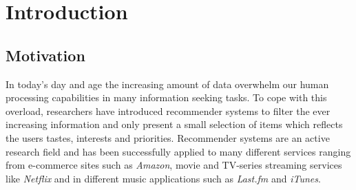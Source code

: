 
\chapter{Introduction}
\label{chap:introduction}
\minitoc
\setcounter{page}{1}
\clearpage

\newcommand{\ecommercenorway}[0]{
  \begin{figure}[H]
    \centering
    \begin{tikzpicture}
      \begin{axis}[
        xlabel={Year},
        ylabel={Percentage},
        legend style={cells={anchor=east}, legend pos=outer north east,},
        xtick=data,
        x tick label style={rotate=45, anchor=east, /pgf/number format/1000 sep=},
        mark size=1.0pt,
        grid=major,
        grid style={dashed},
      ]
      \legend{Both sexes, Men, Women}
      \addplot coordinates {
        (2005, 0)
        (2006, 20)
        (2007, 20)
        (2008, 22)
        (2009, 25)
        (2010, 32)
        (2011, 31)
        (2012, 33)
        (2013, 36)
      };
      \addplot coordinates {
        (2005, 0)
        (2006, 16)
        (2007, 18)
        (2008, 20)
        (2009, 23)
        (2010, 30)
        (2011, 30)
        (2012, 29)
        (2013, 30)
      };
      \addplot coordinates {
        (2005, 0)
        (2006, 24)
        (2007, 23)
        (2008, 23)
        (2009, 27)
        (2010, 34)
        (2011, 31)
        (2012, 37)
        (2013, 42)
      };
      \end{axis}
    \end{tikzpicture}
    \caption{E-commerce purchases in Norway since 2005~\cite{statisticsNorway}}
    \label{fig:ecommerce-norway}
  \end{figure}
}

\section{Motivation}
\label{sec:motivation}

In today's day and age the increasing amount of data overwhelm our human
processing capabilities in many information seeking tasks. To cope with this
overload, researchers have introduced recommender systems to filter the ever
increasing information and only present a small selection of items which
reflects the users tastes, interests and priorities. Recommender systems are an
active research field and has been successfully applied to many different
services ranging from e-commerce sites such as \emph{Amazon}, movie and
TV-series streaming services like \emph{Netflix} and in different music
applications such as \emph{Last.fm} and \emph{iTunes}.


